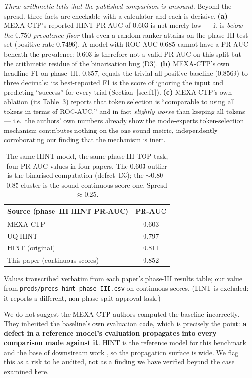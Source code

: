 \documentclass[a4paper,fleqn]{cas-sc}
\begin{document}
\emph{Three arithmetic tells that the published comparison is unsound.} Beyond the spread, three
facts are checkable with a calculator and each is decisive. \textbf{(a)} MEXA-CTP's reported HINT
PR-AUC of $0.603$ is not merely low --- it is \emph{below the $0.750$ prevalence floor} that even a
random ranker attains on the phase-III test set (positive rate $0.7496$). A model with ROC-AUC
$0.685$ cannot have a PR-AUC beneath the prevalence; $0.603$ is therefore not a valid PR-AUC on this
split but the arithmetic residue of the binarisation bug (D3). \textbf{(b)} MEXA-CTP's own headline
F1 on phase~III, $0.857$, equals the trivial all-positive baseline ($0.8569$) to three decimals: its
best-reported F1 is the score of ignoring the input and predicting ``success'' for every trial
(Section~\ref{sec:f1}). \textbf{(c)} MEXA-CTP's own ablation (its Table~3) reports that token
selection is ``comparable to using all tokens in terms of ROC-AUC,'' and in fact \emph{slightly
worse} than keeping all tokens --- i.e.\ the authors' own numbers already show the mode-experts
token-selection mechanism contributes nothing on the one sound metric, independently corroborating
our finding that the mechanism is inert.
\begin{table}[t]
\centering\small
\caption{The same HINT model, the same phase-III TOP task, four PR-AUC values in four papers.
The $0.603$ outlier is the binarised computation (defect~D3); the $\sim0.80$--$0.85$ cluster is
the sound continuous-score one. Spread $\approx0.25$.}
\label{tab:pracross}
\begin{tabular}{lc}
\toprule
Source (phase~III HINT PR-AUC) & PR-AUC \\
\midrule
MEXA-CTP \citep{zhang2025mexactp} & 0.603 \\
UQ-HINT \citep{chen2024uq} & 0.797 \\
HINT (original) \citep{fu2022hint} & 0.811 \\
This paper (continuous scores) & 0.852 \\
\bottomrule
\end{tabular}
\begin{minipage}{\linewidth}\vspace{2pt}\scriptsize Values transcribed verbatim from each paper's phase-III results table; our value from \texttt{preds/preds\_hint\_phase\_III.csv} on continuous scores. (LINT is excluded: it reports a different, non-phase-split approval task.) \end{minipage}
\end{table}
We do not suggest the MEXA-CTP authors computed the baseline incorrectly. They inherited the
baseline's own evaluation code, which is precisely the point: \textbf{a defect in a reference
model's evaluation propagates into every comparison made against it}. HINT is the reference model for this benchmark and the base of downstream work \citep{chen2024uq}, so the propagation surface is wide. We flag this as a risk to be audited, not as a finding we have verified beyond the case examined here.
\end{document}
